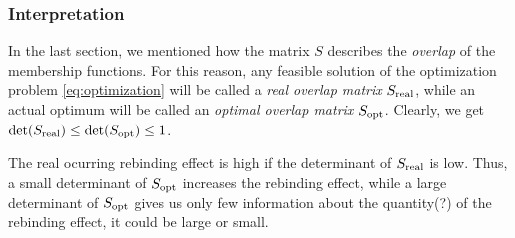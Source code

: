 \subsubsection*{Interpretation}
In the last section, we mentioned how the matrix $S$ describes the \textit{overlap} of the membership functions. 
For this reason, any feasible solution of the optimization problem \eqref{eq:optimization} will be called a \textit{real overlap matrix} $S_{\mathrm{real}}$, while an actual optimum will be called an \textit{optimal overlap matrix} $S_{\mathrm{opt}}$. Clearly, we get $\det(S_{\mathrm{real}}) \leq \det(S_{\mathrm{opt}}) \leq 1$.

The real ocurring rebinding effect is high if the determinant of $S_{\mathrm{real}}$ is low. Thus, a small determinant of $S_{\mathrm{opt}}$ increases the rebinding effect, while a large determinant of $S_{\mathrm{opt}}$ gives us only few information about the quantity(?) of the rebinding effect, it could be large or small.

